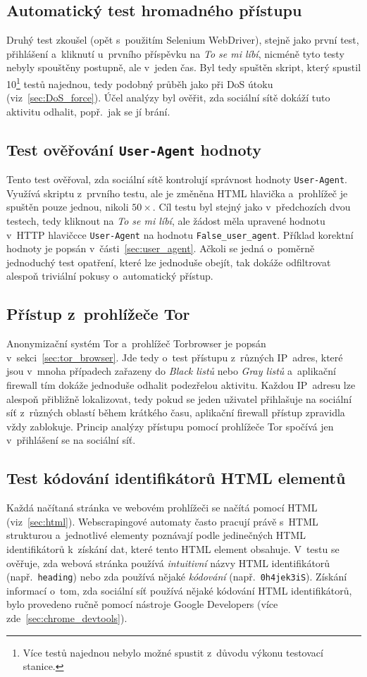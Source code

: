 \subsection*{Automatický test hromadného přístupu}
\label{sec:dos_test}
Druhý test zkoušel (opět s~použitím Selenium WebDriver), stejně jako první test, přihlášení a~kliknutí u~prvního příspěvku na \textit{To se mi líbí}, nicméně tyto testy nebyly spouštěny postupně, ale v~jeden čas. Byl tedy spuštěn skript, který spustil 10\footnote{Více testů najednou nebylo možné spustit z~důvodu výkonu testovací stanice.} testů najednou, tedy podobný průběh jako při DoS útoku (viz~\ref{sec:DoS_force}). Účel analýzy byl ověřit, zda sociální sítě dokáží tuto aktivitu odhalit, popř.~jak se jí brání.

\subsection*{Test ověřování \texttt{User-Agent} hodnoty}
Tento test ověřoval, zda sociální sítě kontrolují správnost hodnoty \texttt{User-Agent}. Využívá skriptu z~prvního testu, ale je změněna HTML hlavička a~prohlížeč je spuštěn pouze jednou, nikoli $50\times$. Cíl testu byl stejný jako v~předchozích dvou testech, tedy kliknout na \textit{To se mi líbí}, ale žádost měla upravené hodnotu v~HTTP hlavičcce \texttt{User-Agent} na hodnotu \texttt{False\_user\_agent}. Příklad korektní hodnoty je popsán v~části~\ref{sec:user_agent}. Ačkoli se jedná o~poměrně jednoduchý test opatření, které lze jednoduše obejít, tak dokáže odfiltrovat alespoň triviální pokusy o~automatický přístup.

\subsection*{Přístup z~prohlížeče Tor}
Anonymizační systém Tor a~prohlížeč Torbrowser je popsán v~sekci~\ref{sec:tor_browser}. Jde tedy o~test přístupu z~různých IP~adres, které jsou v~mnoha případech zařazeny do \textit{Black listů} nebo \textit{Gray listů} a~aplikační firewall tím dokáže jednoduše odhalit podezřelou aktivitu. Každou IP~adresu lze alespoň přibližně lokalizovat, tedy pokud se jeden uživatel přihlašuje na sociální síť z~různých oblastí během krátkého času, aplikační firewall přístup zpravidla vždy zablokuje. Princip analýzy přístupu pomocí prohlížeče Tor spočívá jen v~přihlášení se na sociální síť.

\subsection*{Test kódování identifikátorů HTML elementů}
Každá načítaná stránka ve webovém prohlížeči se načítá pomocí HTML (viz~\ref{sec:html}). Webscrapingové automaty často pracují právě s~HTML strukturou a~jednotlivé elementy poznávají podle jedinečných HTML identifikátorů k~získání dat, které tento HTML element obsahuje. V~testu se ověřuje, zda webová stránka používá \textit{intuitivní} názvy HTML identifikátorů (např.~\texttt{heading}) nebo zda používá nějaké \textit{kódování} (např.~\texttt{0h4jek3iS}). Získání informací o~tom, zda sociální síť používá nějaké kódování HTML identifikátorů, bylo provedeno ručně pomocí nástroje Google Developers (více zde~\ref{sec:chrome_devtools}).

